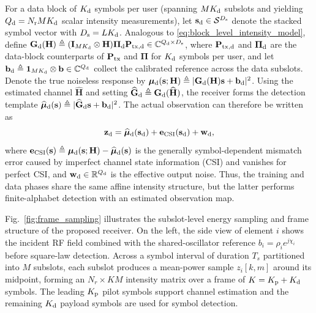 \documentclass[journal]{IEEEtran}
\begin{document}
For a data block of $K_{\rm d}$ symbols per user (spanning $M K_{\rm d}$ subslots and yielding $Q_{\rm d} = N_{\rm r}MK_{\rm d}$ scalar intensity measurements), let $\mathbf s_{\rm d}\in\mathcal S^{D_{\rm s}}$ denote the stacked symbol vector with $D_{\rm s} = LK_{\rm d}$. Analogous to \eqref{eq:block_level_intensity_model}, define $\mathbf G_{\rm d}(\mathbf H)\triangleq (\mathbf I_{MK_{\rm d}}\otimes\mathbf H)\boldsymbol\Pi_{\rm d}\mathbf P_{{\rm tx},{\rm d}}\in\mathbb C^{Q_{\rm d}\times D_{\rm s}}$, where $\mathbf P_{{\rm tx},{\rm d}}$ and $\boldsymbol\Pi_{\rm d}$ are the data-block counterparts of $\mathbf P_{\rm tx}$ and $\boldsymbol\Pi$ for $K_{\rm d}$ symbols per user, and let $\mathbf b_{\rm d}\triangleq \mathbf 1_{MK_{\rm d}}\otimes\mathbf b\in\mathbb C^{Q_{\rm d}}$ collect the calibrated reference across the data subslots. Denote the true noiseless response by $\boldsymbol\mu_{\rm d}(\mathbf s;\mathbf H)\triangleq|\mathbf G_{\rm d}(\mathbf H)\mathbf s+\mathbf b_{\rm d}|^2$. Using the estimated channel $\widehat{\mathbf H}$ and setting $\widehat{\mathbf G}_{\rm d}\triangleq\mathbf G_{\rm d}(\widehat{\mathbf H})$, the receiver forms the detection template $\widehat{\boldsymbol\mu}_{\rm d}(\mathbf s)\triangleq|\widehat{\mathbf G}_{\rm d}\mathbf s+\mathbf b_{\rm d}|^2$. The actual observation can therefore be written as
\begin{equation}
\mathbf{z}_{\rm d}
=
\widehat{\boldsymbol\mu}_{\rm d}(\mathbf s_{\rm d})
+\mathbf e_{\rm CSI}(\mathbf s_{\rm d})
+
\mathbf{w}_{\rm d},
\label{eq:block_data_phase_model}
\end{equation}
where $\mathbf e_{\rm CSI}(\mathbf s)\triangleq\boldsymbol\mu_{\rm d}(\mathbf s;\mathbf H)-\widehat{\boldsymbol\mu}_{\rm d}(\mathbf s)$ is the generally symbol-dependent mismatch error caused by imperfect channel state information (CSI) and vanishes for perfect CSI, and $\mathbf w_{\rm d}\in\mathbb R^{Q_{\rm d}}$ is the effective output noise. Thus, the training and data phases share the same affine intensity structure, but the latter performs finite-alphabet detection with an estimated observation map.

Fig.~\ref{fig:frame_sampling} illustrates the subslot-level energy sampling and frame structure of the proposed receiver. On the left, the side view of element $i$ shows the incident RF field combined with the shared-oscillator reference $b_i = \rho_i e^{j\chi_i}$ before square-law detection. Across a symbol interval of duration $T_s$ partitioned into $M$ subslots, each subslot produces a mean-power sample $z_i[k,m]$ around its midpoint, forming an $N_r \times KM$ intensity matrix over a frame of $K = K_{\rm p} + K_{\rm d}$ symbols. The leading $K_{\rm p}$ pilot symbols support channel estimation and the remaining $K_{\rm d}$ payload symbols are used for symbol detection.
\end{document}
